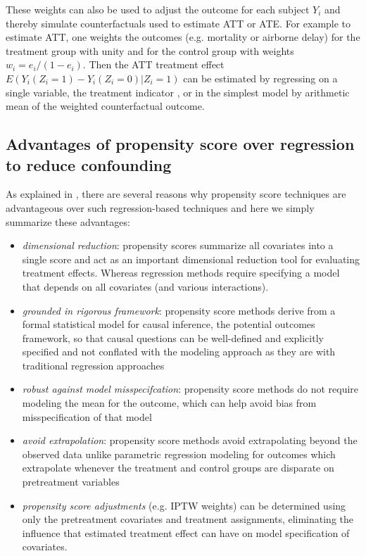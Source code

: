 \documentclass[conference]{IEEEtran}
\begin{document}
These weights can also be used to adjust the outcome for each subject $Y_i$ and thereby simulate counterfactuals used to estimate ATT or ATE.  For example to estimate ATT, one weights the outcomes (e.g. mortality or airborne delay) for the treatment group with unity and for the control group with weights $w_i=e_i/(1-e_i)$.  Then the ATT treatment effect $E(Y_i(Z_i=1)-Y_i(Z_i=0)|Z_i=1)$ can be estimated by regressing on a single variable, the treatment indicator \cite{ridgeway2015toolkit}, or in the simplest model by arithmetic mean of the weighted counterfactual outcome.  


\subsection{Advantages of propensity score over regression to reduce confounding}
As explained in \cite{mccaffrey2013tutorial}, there are several reasons why propensity score techniques are advantageous over such regression-based techniques and here we simply summarize these advantages:

\begin{itemize}
\item \emph{dimensional reduction}: propensity scores summarize all covariates into a single score and act as an important dimensional reduction tool for evaluating treatment effects. Whereas regression methods require specifying a model that depends on all covariates (and various interactions).

\item  \emph{grounded in rigorous framework}: propensity score methods derive from a formal statistical model for causal inference, the potential outcomes framework, so that causal questions can be well-defined and explicitly specified and not conflated with the modeling approach as they are with traditional regression approaches

\item  \emph{robust against model misspecifcation}: propensity score methods do not require modeling the mean for the outcome, which can help avoid bias from misspecification of that model 

\item \emph{avoid extrapolation}: propensity score methods avoid extrapolating beyond the observed data unlike parametric regression modeling for outcomes which extrapolate whenever the treatment and control groups are disparate on pretreatment variables

\item \emph{propensity score adjustments} (e.g. IPTW weights) can be determined using only the pretreatment covariates and treatment assignments, eliminating the influence that estimated treatment effect can have on model specification of covariates.
\end{itemize}
\end{document}
